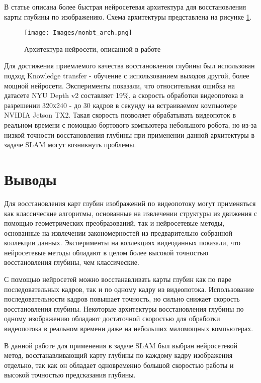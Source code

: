 \documentclass{mipt-thesis-bs}
\begin{document}
В статье \cite{spek2018cream} описана более быстрая нейросетевая архитектура для восстановления карты глубины по изображению. Схема архитектуры представлена на рисунке \ref{figurecream}.

\begin{figure}
	\centering
	\texttt{[image: Images/nonbt\_arch.png]}
	\label{figurecream}
	\caption{Архитектура нейросети, описанной в работе \cite{spek2018cream}}
\end{figure}

Для достижения приемлемого качества восстановления глубины был использован подход Knowledge transfer - обучение с использованием выходов другой, более мощной нейросети. Эксперименты показали, что относительная ошибка на датасете NYU Depth v2 составляет 19\%, а скорость обработки видеопотока в разрешении 320х240 - до 30 кадров в секунду на встраиваемом компьютере NVIDIA Jetson TX2. Такая скорость позволяет обрабатывать видеопоток в реальном времени с помощью бортового компьютера небольшого робота, но из-за низкой точности восстановления глубины при применении данной архитектуры в задаче SLAM могут возникнуть проблемы.

\section{Выводы}
Для восстановления карт глубин изображений по видеопотоку могут применяться как классические алгоритмы, основанные на извлечении структуры из движения с помощью геометрических преобразований, так и нейросетевые методы, основанные на извлечении закономерностей из предварительно собранной коллекции данных. Эксперименты на коллекциях видеоданных показали, что нейросетевые методы обладают в целом более высокой точностью восстановления глубины, чем классические.

С помощью нейросетей можно восстанавливать карты глубин как по паре последовательных кадров, так и по одному кадру из видеопотока. Использование последовательности кадров повышает точность, но сильно снижает скорость восстановления глубины. Некоторые архитектуры восстановления глубины по одному изображению обладают достаточной скоростью для обработки видеопотока в реальном времени даже на небольших маломощных компьютерах.

В данной работе для применения в задаче SLAM был выбран нейросетевой метод, восстанавливающий карту глубины по каждому кадру изображения отдельно, так как он обладает одновременно большой скоростью работы и высокой точностью предсказания глубины.
\end{document}
